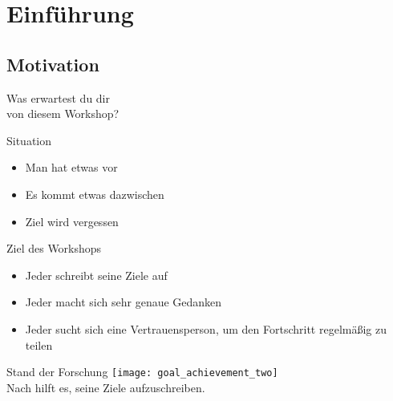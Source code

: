 \section{Einführung}

\subsection{Motivation}


\begin{frame}[standout]
    \LARGE
    Was erwartest du dir \\
    von diesem Workshop?
\end{frame}


\begin{frame}[c]{Situation}
    \Large
    \begin{itemize}[<+(1)->]
        \item Man hat etwas vor
        \item Es kommt etwas dazwischen
        \item Ziel wird vergessen
    \end{itemize}
\end{frame}

\begin{frame}[c]{Ziel des Workshops}
    \Large
    \begin{itemize}[<+(1)->]
        \item Jeder schreibt seine Ziele auf
        \item Jeder macht sich sehr genaue Gedanken
        \item Jeder sucht sich eine Vertrauensperson, um den Fortschritt regelmäßig zu teilen
    \end{itemize}
\end{frame}


\begin{frame}[c]{Stand der Forschung}
    \texttt{[image: goal\_achievement\_two]} \\
    Nach \cite{better-goals-2} hilft es, seine Ziele aufzuschreiben.
\end{frame}

